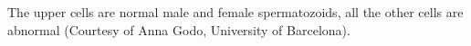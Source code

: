 \label{fig:intro} The upper cells are normal male and female spermatozoids, all the other cells are abnormal (Courtesy of Anna Godo, University of Barcelona).